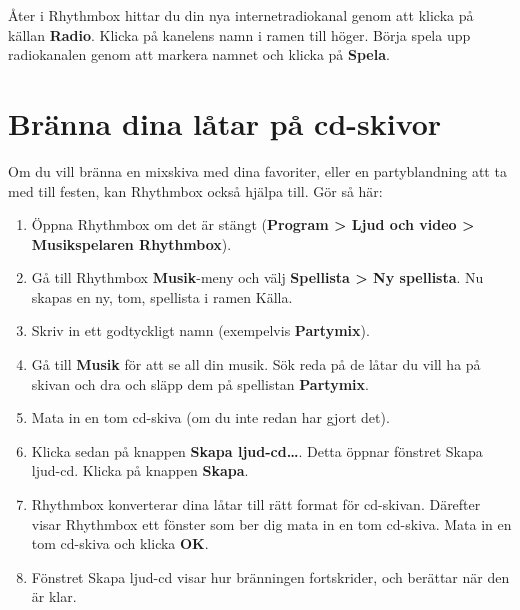 \documentclass[a4paper,final]{memoir} %
\begin{document}

Åter i Rhythmbox hittar du din nya internetradiokanal genom att klicka på källan \textbf{Radio}. Klicka på kanelens namn i ramen till höger. Börja spela upp radiokanalen genom att markera namnet och klicka på \textbf{Spela}.


\section{Bränna dina låtar på cd-skivor}


Om du vill bränna en mixskiva med dina favoriter, eller en partyblandning att ta med till festen, kan Rhythmbox också hjälpa till. Gör så här:

\begin{enumerate}

\item Öppna Rhythmbox om det är stängt (\textbf{Program \textgreater{} Ljud och video \textgreater{} Musikspelaren Rhythmbox}). 

\item Gå till Rhythmbox \textbf{Musik}-meny och välj \textbf{Spellista \textgreater{} Ny spellista}. Nu skapas en ny, tom, spellista i ramen Källa.

\item Skriv in ett godtyckligt namn (exempelvis \textbf{Partymix}). 

\item Gå till \textbf{Musik} för att se all din musik. Sök reda på de låtar du vill ha på skivan och dra och släpp dem på spellistan \textbf{Partymix}. 

\item Mata in en tom cd-skiva (om du inte redan har gjort det).

\item Klicka sedan på knappen \textbf{Skapa ljud-cd\ldots{}}. Detta öppnar fönstret Skapa ljud-cd. Klicka på knappen \textbf{Skapa}.

\item Rhythmbox konverterar dina låtar till rätt format för cd-skivan. Därefter visar Rhythmbox ett fönster som ber dig mata in en tom cd-skiva. Mata in en tom cd-skiva och klicka \textbf{OK}.

\item Fönstret Skapa ljud-cd visar hur bränningen fortskrider, och berättar när den är klar.

\end{enumerate}
\end{document}
